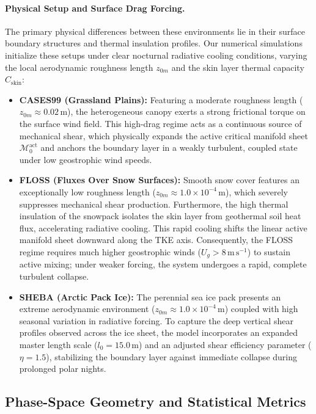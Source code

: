 \documentclass[11pt,letterpaper]{article}
\begin{document}
\paragraph{Physical Setup and Surface Drag Forcing.}
The primary physical differences between these environments lie in their surface boundary structures and thermal insulation profiles. Our numerical simulations initialize these setups under clear nocturnal radiative cooling conditions, varying the local aerodynamic roughness length $z_{0m}$ and the skin layer thermal capacity $C_{\mathrm{skin}}$:
\begin{itemize}
    \item \textbf{CASES99 (Grassland Plains):} Featuring a moderate roughness length ($z_{0m} \approx 0.02\,\mathrm{m}$), the heterogeneous canopy exerts a strong frictional torque on the surface wind field. This high-drag regime acts as a continuous source of mechanical shear, which physically expands the active critical manifold sheet $\mathcal{M}_0^{\text{act}}$ and anchors the boundary layer in a weakly turbulent, coupled state under low geostrophic wind speeds.
    \item \textbf{FLOSS (Fluxes Over Snow Surfaces):} Smooth snow cover features an exceptionally low roughness length ($z_{0m} \approx 1.0 \times 10^{-4}\,\mathrm{m}$), which severely suppresses mechanical shear production. Furthermore, the high thermal insulation of the snowpack isolates the skin layer from geothermal soil heat flux, accelerating radiative cooling. This rapid cooling shifts the linear active manifold sheet downward along the TKE axis. Consequently, the FLOSS regime requires much higher geostrophic winds ($U_g > 8\,\mathrm{m\,s}^{-1}$) to sustain active mixing; under weaker forcing, the system undergoes a rapid, complete turbulent collapse.
    \item \textbf{SHEBA (Arctic Pack Ice):} The perennial sea ice pack presents an extreme aerodynamic environment ($z_{0m} \approx 1.0 \times 10^{-4}\,\mathrm{m}$) coupled with high seasonal variation in radiative forcing. To capture the deep vertical shear profiles observed across the ice sheet, the model incorporates an expanded master length scale ($l_0 = 15.0\,\mathrm{m}$) and an adjusted shear efficiency parameter ($\eta = 1.5$), stabilizing the boundary layer against immediate collapse during prolonged polar nights.
\end{itemize}

\medskip

\subsection{Phase-Space Geometry and Statistical Metrics}
\label{subsec:comparative_metrics}
\end{document}
